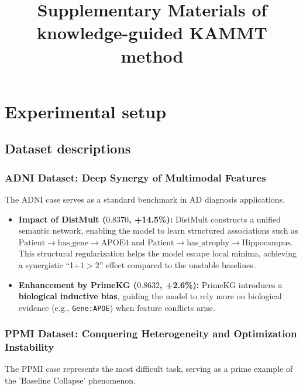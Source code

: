 \documentclass[sn-mathphys-num]{sn-jnl}%
\theoremstyle{thmstyleone}%
\theoremstyle{thmstyletwo}%
\theoremstyle{thmstylethree}%
\begin{document}
\title[Article Title]{Supplementary Materials of knowledge-guided KAMMT method}



\maketitle



\section{Experimental setup}

    

    \subsection{Dataset descriptions}

    \subsubsection{ADNI Dataset: Deep Synergy of Multimodal Features}
    
    The ADNI case serves as a standard benchmark in AD diagnosis applications.
    
    \begin{itemize}
        \item \textbf{Impact of DistMult ($0.8370$, +14.5\%):} DistMult constructs a unified semantic network, enabling the model to learn structured associations such as $\text{Patient} \to \text{has\_gene} \to \text{APOE4}$ and $\text{Patient} \to \text{has\_atrophy} \to \text{Hippocampus}$. This structural regularization helps the model escape local minima, achieving a synergistic ``1+1$>$2'' effect compared to the unstable baselines.
        \item \textbf{Enhancement by PrimeKG ($0.8632$, +2.6\%):} PrimeKG introduces a \textbf{biological inductive bias}, guiding the model to rely more on biological evidence (e.g., \texttt{Gene:APOE}) when feature conflicts arise.
    \end{itemize}
    
    \subsubsection{PPMI Dataset: Conquering Heterogeneity and Optimization Instability}
    
    The PPMI case represents the most difficult task, serving as a prime example of the 'Baseline Collapse' phenomenon.
    
\end{document}
